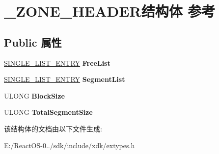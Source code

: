 \hypertarget{struct___z_o_n_e___h_e_a_d_e_r}{}\section{\+\_\+\+Z\+O\+N\+E\+\_\+\+H\+E\+A\+D\+E\+R结构体 参考}
\label{struct___z_o_n_e___h_e_a_d_e_r}
\subsection*{Public 属性}
\begin{DoxyCompactItemize}
\item 
\mbox{\label{struct___z_o_n_e___h_e_a_d_e_r_af6c36523b6b88ea339b2503398bcbfae}} 
\hyperlink{struct___s_i_n_g_l_e___l_i_s_t___e_n_t_r_y}{S\+I\+N\+G\+L\+E\+\_\+\+L\+I\+S\+T\+\_\+\+E\+N\+T\+RY} {\bfseries Free\+List}
\item 
\mbox{\label{struct___z_o_n_e___h_e_a_d_e_r_ab3dfdd8a116499f8aa43f9048228cd90}} 
\hyperlink{struct___s_i_n_g_l_e___l_i_s_t___e_n_t_r_y}{S\+I\+N\+G\+L\+E\+\_\+\+L\+I\+S\+T\+\_\+\+E\+N\+T\+RY} {\bfseries Segment\+List}
\item 
\mbox{\label{struct___z_o_n_e___h_e_a_d_e_r_a7b983b7dd2cdcf51c342c86c7e4fb1a9}} 
U\+L\+O\+NG {\bfseries Block\+Size}
\item 
\mbox{\label{struct___z_o_n_e___h_e_a_d_e_r_a581f682da21d140ac1e4252ac918525f}} 
U\+L\+O\+NG {\bfseries Total\+Segment\+Size}
\end{DoxyCompactItemize}


该结构体的文档由以下文件生成\+:\begin{DoxyCompactItemize}
\item 
E\+:/\+React\+O\+S-\/0../sdk/include/xdk/extypes.\+h\end{DoxyCompactItemize}
